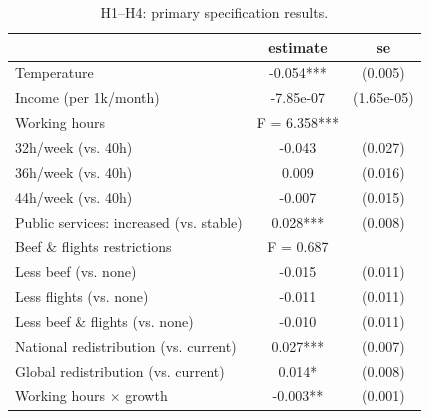 \begin{table}[H]
    \centering
    \caption{H1--H4: primary specification results.}
    \begin{tabular}{ l c c }
\hline \hline
 & estimate & se \\
\hline
\hspace{0.05cm} Temperature & -0.054*** & (0.005) \\
\hspace{0.05cm} Income (per 1k/month) & -7.85e-07 & (1.65e-05) \\
\hspace{0.05cm} Working hours & F = 6.358*** &  \\
\hspace{0.05cm} \hspace{1em} 32h/week (vs. 40h) & -0.043 & (0.027) \\
\hspace{0.05cm} \hspace{1em} 36h/week (vs. 40h) & 0.009 & (0.016) \\
\hspace{0.05cm} \hspace{1em} 44h/week (vs. 40h) & -0.007 & (0.015) \\
\hspace{0.05cm} Public services: increased (vs. stable) & 0.028*** & (0.008) \\
\hspace{0.05cm} Beef \& flights restrictions & F = 0.687 &  \\
\hspace{0.05cm} \hspace{1em} Less beef (vs. none) & -0.015 & (0.011) \\
\hspace{0.05cm} \hspace{1em} Less flights (vs. none) & -0.011 & (0.011) \\
\hspace{0.05cm} \hspace{1em} Less beef \& flights (vs. none) & -0.010 & (0.011) \\
\hspace{0.05cm} National redistribution (vs. current) & 0.027*** & (0.007) \\
\hspace{0.05cm} Global redistribution (vs. current) & 0.014* & (0.008) \\
\hspace{0.05cm} Working hours $\times$ growth & -0.003** & (0.001) \\

\end{tabular}
\end{table}
